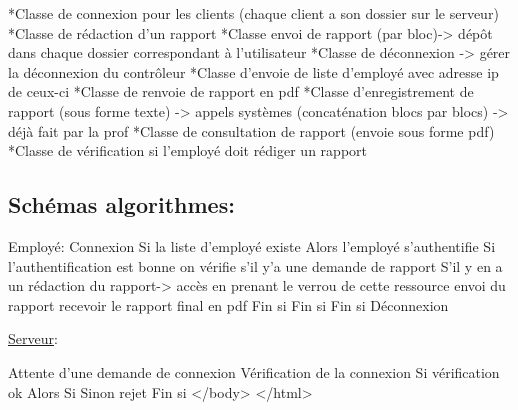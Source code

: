 \begin{DoxyPre}*Classe de connexion pour les clients (chaque client a son dossier sur le serveur)
*Classe de rédaction d'un rapport
*Classe envoi de rapport (par bloc)-> dépôt dans chaque dossier correspondant à l'utilisateur
*Classe de déconnexion -> gérer la déconnexion du contrôleur
*Classe d'envoie de liste d'employé avec adresse ip de ceux-ci
*Classe de renvoie de rapport en pdf 
*Classe d'enregistrement de rapport (sous forme texte) -> appels systèmes (concaténation blocs par blocs) -> déjà fait par la prof
*Classe de consultation de rapport (envoie sous forme pdf) 
*Classe de vérification si l'employé doit rédiger un rapport\end{DoxyPre}



\begin{DoxyPre}\subsection*{Schémas algorithmes:}\end{DoxyPre}



\begin{DoxyPre}
Employé:
Connexion
Si la liste d'employé existe
Alors l'employé s'authentifie
  Si l'authentification est bonne
        on vérifie s'il y'a une demande de rapport
        S'il y en a un
        rédaction du rapport-> accès en prenant le verrou de cette ressource
        envoi du rapport
        recevoir le rapport final en pdf
        Fin si
    Fin si
Fin si
Déconnexion\end{DoxyPre}



\begin{DoxyPre}\hyperlink{class_serveur}{Serveur}:\end{DoxyPre}



\begin{DoxyPre}Attente d'une demande de connexion
Vérification de la connexion
Si vérification ok
Alors
    Si 
Sinon rejet
Fin si
    </body>
</html>
\end{DoxyPre}
